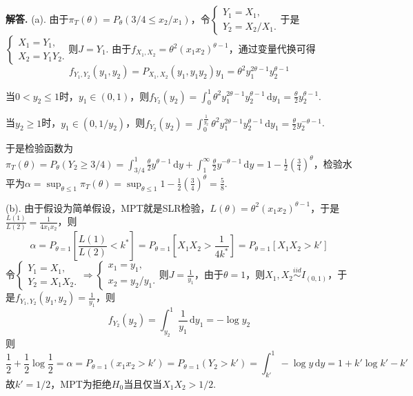 \documentclass[12pt, a4paper, oneside]{ctexart}
\newenvironment{solution}[1][]{\par\noindent\textbf{#1解答. }}{\smallskip\par}  %
\let\leq=\leqslant %
\let\geq=\geqslant %
\def\d{\mathrm{d}}          %
\begin{document}
\begin{solution}
    (a). 由于$\pi_T(\theta) = P_\theta(3/4\leq x_2/x_1)$，令$\begin{cases}
        Y_1 = X_1,\\ Y_2=X_2/X_1.
    \end{cases}$于是$\begin{cases}
        X_1=Y_1,\\
        X_2=Y_1Y_2.
    \end{cases}$则$J = Y_1$. 由于$f_{X_1,X_2} = \theta^2(x_1x_2)^{\theta-1}$，通过变量代换可得
    \begin{equation*}
        f_{Y_1,Y_2}(y_1,y_2) = P_{X_1,X_2}(y_1,y_1y_2)y_1 = \theta^2 y_1^{2\theta-1}y_2^{\theta-1}
    \end{equation*}

    当$0 < y_2\leq 1$时，$y_1\in (0,1)$，则$f_{Y_2}(y_2) = \int_0^1\theta^2y_1^{2\theta-1}y_2^{\theta-1}\,\d y_1 = \frac{\theta}{2}y_2^{\theta-1}$.

    当$y_2\geq 1$时，$y_1\in (0,1/y_2)$，则$f_{Y_2}(y_2) = \int_0^{\frac{1}{y_2}}\theta^2y_1^{2\theta-1}y_2^{\theta-1}\,\d y_1 = \frac{\theta}{2}y_2^{-\theta-1}$.

    于是检验函数为$\pi_T(\theta) = P_{\theta}(Y_2\geq 3/4)=\int_{3/4}^1\frac{\theta}{2}y^{\theta-1}\,\d y+\int_1^\infty\frac{\theta}{2}y^{-\theta-1}\,\d y = 1-\frac{1}{2}\left(\frac{3}{4}\right)^{\theta}$，检验水平为$\alpha = \sup_{\theta\leq 1}\pi_T(\theta) = \sup_{\theta \leq 1}1-\frac{1}{2}\left(\frac{3}{4}\right)^\theta = \frac{5}{8}$.

    (b). 由于假设为简单假设，MPT就是SLR检验，$L(\theta) = \theta^2(x_1x_2)^{\theta-1}$，于是$\frac{L(1)}{L(2)} = \frac{1}{4x_1x_2}$，则
    \begin{equation*}
        \alpha=P_{\theta=1}\left[\frac{L(1)}{L(2)}< k^*\right]= P_{\theta = 1}\left[X_1X_2> \frac{1}{4k^*}\right] = P_{\theta = 1}[X_1X_2> k']
    \end{equation*}
    令$\begin{cases}
        Y_1 = X_1,\\
        Y_2 = X_1X_2.
    \end{cases}\Rightarrow \begin{cases}
        x_1 = y_1,\\
        x_2 = y_2/y_1.
    \end{cases}$则$J = \frac{1}{y_1}$，由于$\theta = 1$，则$X_1,X_2\overset{iid}{\sim}I_{(0,1)}$，于是$f_{Y_1,Y_2}(y_1,y_2) = \frac{1}{y_1}$，则
    \begin{equation*}
        f_{Y_2}(y_2) = \int_{y_2}^1\frac{1}{y_1}\,\d y_1 = -\log y_2
    \end{equation*}
    则
    \begin{equation*}
        \frac{1}{2}+\frac{1}{2}\log\frac{1}{2}=\alpha = P_{\theta=1}(x_1x_2> k') = P_{\theta = 1}(Y_2> k') = \int_{k'}^1-\log y\,\d y = 1+k'\log k'-k'
    \end{equation*}
    故$k' = 1/2$，MPT为拒绝$H_0$当且仅当$X_1X_2> 1/2$.
\end{solution}
\end{document}
